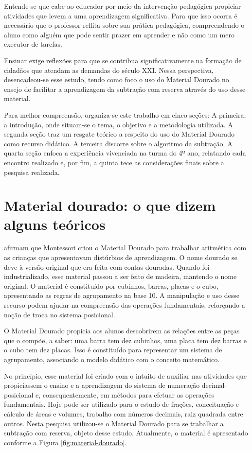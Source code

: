 \begin{refsection}
    Entende-se que cabe ao educador por meio da intervenção pedagógica propiciar atividades que levem a uma aprendizagem significativa. Para que isso ocorra é necessário que o professor reflita sobre sua prática pedagógica, compreendendo o aluno como alguém que pode sentir prazer em aprender e não como um mero executor de tarefas.  

    Ensinar exige reflexões para que se contribua significativamente na formação de cidadãos que atendam as demandas do século XXI. Nessa perspectiva, desencadeou-se esse estudo, tendo como foco o uso do Material Dourado no ensejo de facilitar a aprendizagem da subtração com reserva através do uso desse material. 

    Para melhor compreensão, organiza-se este trabalho em cinco seções: A primeira, a introdução, onde situam-se o tema, o objetivo e a metodologia utilizada. A segunda seção traz um resgate teórico a respeito do uso do Material Dourado como recurso didático. A terceira discorre sobre o algoritmo da subtração. A quarta seção enfoca a experiência vivenciada na turma do 4º ano, relatando cada encontro realizado e, por fim, a quinta tece as considerações finais sobre a pesquisa realizada.

    \section{Material dourado: o que dizem alguns teóricos}

    \textcite{BERTONAndITACARAMBI2009Números} afirmam que Montessori criou o Material Dourado para trabalhar aritmética com as crianças que apresentavam distúrbios de aprendizagem. O nome dourado se deve à versão original que era feita com contas douradas. Quando foi industrializado, esse material passou a ser feito de madeira, mantendo o nome original. O material é constituído por cubinhos, barras, placas e o cubo, apresentando as regras de agrupamento na base 10. A manipulação e uso desse recurso podem ajudar na compreensão das operações fundamentais, reforçando a noção de troca no sistema posicional.  

    O Material Dourado propicia aos alunos descobrirem as relações entre as peças que o compõe, a saber: uma barra tem dez cubinhos, uma placa tem dez barras e o cubo tem dez placas. Isso é constituído para representar um sistema de agrupamento, associando o modelo didático com o conceito matemático. 

    No princípio, esse material foi criado com o intuito de auxiliar nas atividades que propiciassem o ensino e a aprendizagem do sistema de numeração decimal-posicional e, consequentemente, em métodos para efetuar as operações fundamentais. Hoje pode ser utilizado para o estudo de frações, conceituação e cálculo de áreas e volumes, trabalho com números decimais, raiz quadrada entre outros. Nesta pesquisa utilizou-se o Material Dourado para se trabalhar a subtração com reserva, objeto desse estudo. Atualmente, o material é apresentado conforme a Figura \ref{fig:material-dourado}.


\end{refsection}
